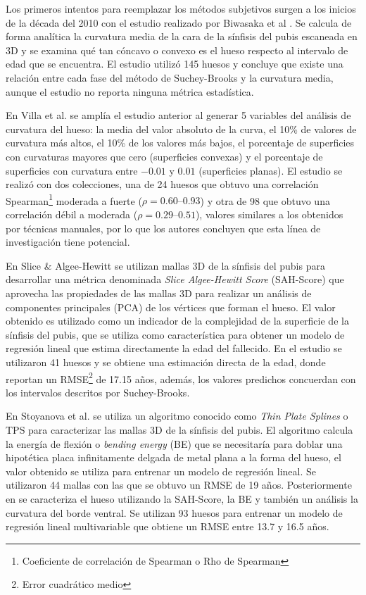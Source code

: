 Los primeros intentos para reemplazar los métodos subjetivos surgen a los inicios de la década del 2010 con el estudio realizado por Biwasaka et al \cite{biwasaka2013three}. Se calcula de forma analítica la curvatura media de la cara de la sínfisis del pubis escaneada en 3D y se examina qué tan cóncavo o convexo es el hueso respecto al intervalo de edad que se encuentra. El estudio utilizó 145 huesos y concluye que existe una relación entre cada fase del método de Suchey-Brooks y la curvatura media, aunque el estudio no reporta ninguna métrica estadística. 

En Villa et al. \cite{villa2015quantitative} se amplía el estudio anterior al generar 5 variables del análisis de curvatura del hueso: la media del valor absoluto de la curva, el 10\% de valores de curvatura más altos, el 10\% de los valores más bajos, el porcentaje de superficies con curvaturas mayores que cero (superficies convexas) y el porcentaje de superficies con curvatura entre $-0.01$ y $0.01$ (superficies planas). El estudio se realizó con dos colecciones, una de 24 huesos que obtuvo una correlación Spearman\footnote{Coeficiente de correlación de Spearman o Rho de Spearman} moderada a fuerte ($\rho=0.60–0.93$) y otra de 98 que obtuvo una correlación débil a moderada ($\rho=0.29–0.51$), valores similares a los obtenidos por técnicas manuales, por lo que los autores concluyen que esta línea de investigación tiene potencial.

En Slice \& Algee-Hewitt \cite{slice2015modeling} se utilizan mallas 3D de la sínfisis del pubis para desarrollar una métrica denominada \textit{Slice Algee-Hewitt Score} (SAH-Score) que aprovecha las propiedades de las mallas 3D para realizar un análisis de componentes principales (PCA) de los vértices que forman el hueso. El valor obtenido es utilizado como un indicador de la complejidad de la superficie de la sínfisis del pubis, que se utiliza como característica para obtener un modelo de regresión lineal que estima directamente la edad del fallecido. En el estudio se utilizaron 41 huesos y se obtiene una estimación directa de la edad, donde reportan un RMSE\footnote{Error cuadrático medio} de 17.15 años, además, los valores predichos concuerdan con los intervalos descritos por Suchey-Brooks.

En Stoyanova et al. \cite{stoyanova2015enhanced} se utiliza un algoritmo conocido como \textit{Thin Plate Splines} o TPS para caracterizar las mallas 3D de la sínfisis del pubis. El algoritmo calcula la energía de flexión o \textit{bending energy} (BE) que se necesitaría para doblar una hipotética placa infinitamente delgada de metal plana a la forma del hueso, el valor obtenido se utiliza para entrenar un modelo de regresión lineal. Se utilizaron 44 mallas con las que se obtuvo un RMSE de 19 años. Posteriormente en \cite{stoyanova2017computational} se caracteriza el hueso utilizando la SAH-Score, la BE y también un análisis la curvatura del borde ventral. Se utilizan 93 huesos para entrenar un modelo de regresión lineal multivariable que obtiene un RMSE entre 13.7 y 16.5 años.

